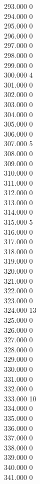 { 293.000	0 \\
 294.000	0 \\
 295.000	0 \\
 296.000	0 \\
 297.000	0 \\
 298.000	0 \\
 299.000	0 \\
 300.000	4 \\
 301.000	0 \\
 302.000	0 \\
 303.000	0 \\
 304.000	0 \\
 305.000	0 \\
 306.000	0 \\
 307.000	5 \\
 308.000	0 \\
 309.000	0 \\
 310.000	0 \\
 311.000	0 \\
 312.000	0 \\
 313.000	0 \\
 314.000	0 \\
 315.000	5 \\
 316.000	0 \\
 317.000	0 \\
 318.000	0 \\
 319.000	0 \\
 320.000	0 \\
 321.000	0 \\
 322.000	0 \\
 323.000	0 \\
 324.000	13 \\
 325.000	0 \\
 326.000	0 \\
 327.000	0 \\
 328.000	0 \\
 329.000	0 \\
 330.000	0 \\
 331.000	0 \\
 332.000	0 \\
 333.000	10 \\
 334.000	0 \\
 335.000	0 \\
 336.000	0 \\
 337.000	0 \\
 338.000	0 \\
 339.000	0 \\
 340.000	0 \\
 341.000	0 \\
}
